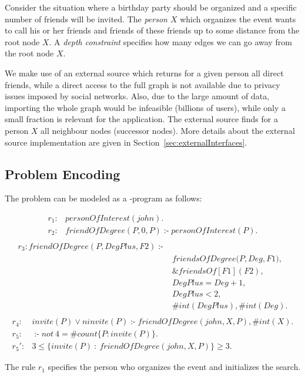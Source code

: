 \documentclass[14pt,a4paper, titlepage]{article}
\newcommand{\ext}[3]{\ensuremath{\&{#1}[#2](#3)}}
\DeclareMathOperator{\leftimpl}{:-}
\begin{document}
Consider the situation where a birthday party should be 
organized and a specific number of friends will be invited. 
The \emph{person $X$} which organizes the event wants to 
call his or her friends and friends of these friends up to 
some distance from the root node $X$. A \emph{depth 
constraint} specifies how many edges we can go away from 
the root node $X$.
 

We make use of an external source which returns for a given 
person all direct friends, while a direct access to the 
full graph is not available due to privacy issues imposed 
by social networks. Also, due to the large amount of data, 
importing the whole graph would be infeasible (billions of 
users), while only a small fraction is relevant for the 
application. The external source finds for a person $X$ all 
neighbour nodes (successor nodes). More details about the 
external source implementation are given in 
Section~\ref{sec:externalInterfaces}. 
               

\subsection{Problem Encoding}
The problem can be modeled as a \hex{}-program as follows:
\begin{exmp}
\label{faceQuery}
\begin{align*}
r_1\colon & \mathit{personOfInterest}(\mathit{john}). \\
r_2\colon & \mathit{friendOfDegree}(\mathit{P, 0, P}) 
\leftimpl  \mathit{personOfInterest}(P).\\
\end{align*}
\begin{align*}
r_{3}\colon \mathit{friendOfDegree}(\mathit{P, DegPlus, 
F2}) \leftimpl & \\  
& \mathit{friendsOfDegree}(\mathit{P,Deg,F1)},\\
& \ext{friendsOf}{F1}{F2},\\ 
& \mathit{DegPlus = Deg + 1}, \\
& \mathit{DegPlus < 2},\\
& \mathit{\#int(DegPlus)}, \mathit{\#int(Deg)}.\\
\end{align*}
\begin{align*}
r_{4}\colon & \mathit{invite(P)} \vee \mathit{ninvite(P) 
\leftimpl  friendOfDegree(john,X,P), \#int(X).}\\
r_{5}\colon & \leftimpl   \mathit{not} \ 4 = \mathit{\#count} 
\{ P : \mathit{invite(P)} \}. \\
r_5 \prime  \colon & 3 \leq \{ invite(P) \ \colon \ friendOfDegree(john,X,P)\} \geq 3.
\end{align*}
\end{exmp}
The rule $r_1$ specifies the person who organizes the event 
and initializes the search. 
\end{document}
